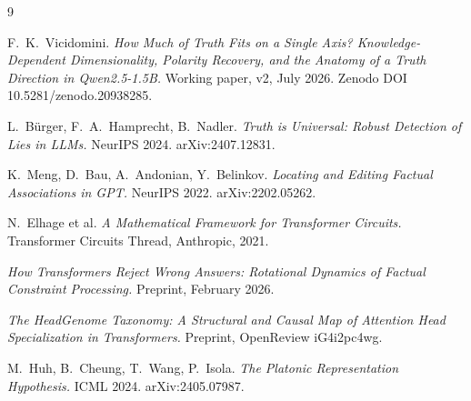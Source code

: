 \documentclass[11pt]{article}
\begin{document}
\begin{thebibliography}{9}

 F.~K.~Vicidomini.
\emph{How Much of Truth Fits on a Single Axis? Knowledge-Dependent
Dimensionality, Polarity Recovery, and the Anatomy of a Truth Direction in
Qwen2.5-1.5B.} Working paper, v2, July 2026. Zenodo DOI
10.5281/zenodo.20938285.

 L.~B\"urger, F.~A.~Hamprecht, B.~Nadler.
\emph{Truth is Universal: Robust Detection of Lies in LLMs.}
NeurIPS 2024. arXiv:2407.12831.

 K.~Meng, D.~Bau, A.~Andonian, Y.~Belinkov.
\emph{Locating and Editing Factual Associations in GPT.}
NeurIPS 2022. arXiv:2202.05262.

 N.~Elhage et al.
\emph{A Mathematical Framework for Transformer Circuits.}
Transformer Circuits Thread, Anthropic, 2021.

 \emph{How Transformers Reject Wrong Answers:
Rotational Dynamics of Factual Constraint Processing.}
Preprint, February 2026.

 \emph{The HeadGenome Taxonomy: A Structural and Causal
Map of Attention Head Specialization in Transformers.}
Preprint, OpenReview iG4i2pc4wg.

 M.~Huh, B.~Cheung, T.~Wang, P.~Isola.
\emph{The Platonic Representation Hypothesis.}
ICML 2024. arXiv:2405.07987.

\end{thebibliography}
\end{document}
